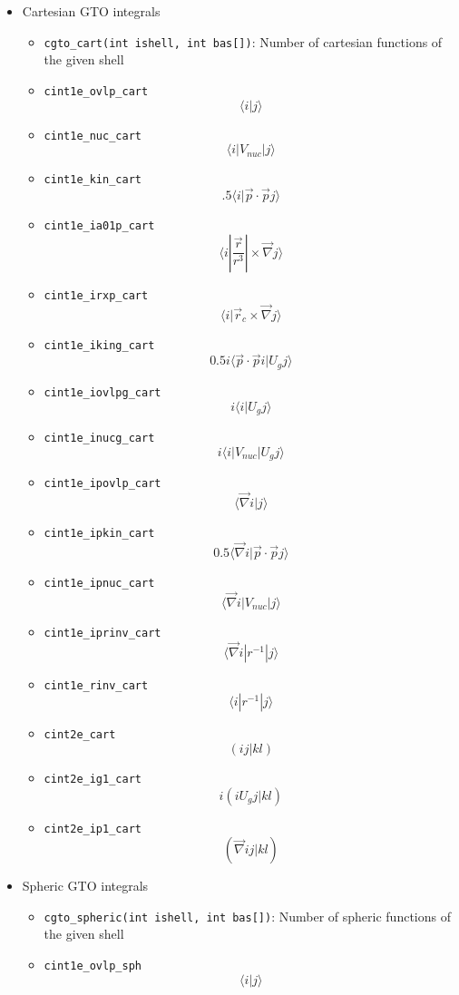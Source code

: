 \documentclass{article}
\begin{document}
\begin{itemize}
\item
  Cartesian GTO integrals
  \begin{itemize}
  \item
    \verb!cgto_cart(int ishell, int bas[])!: Number of cartesian
    functions of the given shell
  \item
    \verb!cint1e_ovlp_cart! \[\langle i| j\rangle \]
  \item
    \verb!cint1e_nuc_cart! \[\langle i| V_{nuc} | j\rangle \]
  \item
    \verb!cint1e_kin_cart!
    \[.5\langle i| \vec{p} \cdot \vec{p} j\rangle \]
  \item
    \verb!cint1e_ia01p_cart!
    \[\langle i| \frac{\vec{r}}{r^3}| \times \vec{\nabla} j\rangle \]
  \item
    \verb!cint1e_irxp_cart!
    \[\langle i| \vec{r}_c \times \vec{\nabla} j\rangle \]
  \item
    \verb!cint1e_iking_cart!
    \[0.5i\langle \vec{p} \cdot \vec{p} i| U_gj\rangle \]
  \item
    \verb!cint1e_iovlpg_cart! \[i \langle i| U_gj\rangle \]
  \item
    \verb!cint1e_inucg_cart! \[i \langle i| V_{nuc}| U_gj\rangle \]
  \item
    \verb!cint1e_ipovlp_cart! \[\langle \vec{\nabla} i|j\rangle \]
  \item
    \verb!cint1e_ipkin_cart!
    \[0.5\langle \vec{\nabla} i| \vec{p} \cdot \vec{p} j\rangle \]
  \item
    \verb!cint1e_ipnuc_cart!
    \[\langle \vec{\nabla} i| V_{nuc}|j\rangle \]
  \item
    \verb!cint1e_iprinv_cart!
    \[\langle \vec{\nabla} i| r^{-1}|j\rangle \]
  \item
    \verb!cint1e_rinv_cart! \[\langle i| r^{-1} |j\rangle \]
  \item
    \verb!cint2e_cart! \[(ij|kl)\]
  \item
    \verb!cint2e_ig1_cart! \[i(i U_g j|kl)\]
  \item
    \verb!cint2e_ip1_cart! \[(\vec{\nabla} i j|kl)\]
  \end{itemize}
\item
  Spheric GTO integrals
  \begin{itemize}
  \item
    \verb!cgto_spheric(int ishell, int bas[])!: Number of spheric
    functions of the given shell
  \item
    \verb!cint1e_ovlp_sph! \[\langle  i| j\rangle \]

\end{itemize}
\end{itemize}
\end{document}
